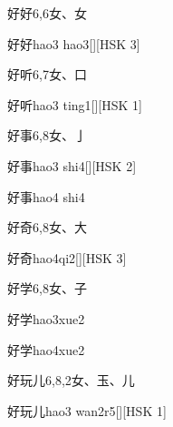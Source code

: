 \begin{entry}{好好}{6,6}{⼥、⼥}
  \begin{phonetics}{好好}{hao3 hao3}[][HSK 3]
  \end{phonetics}
\end{entry}

\begin{entry}{好听}{6,7}{⼥、⼝}
  \begin{phonetics}{好听}{hao3 ting1}[][HSK 1]
  \end{phonetics}
\end{entry}

\begin{entry}{好事}{6,8}{⼥、⼅}
  \begin{phonetics}{好事}{hao3 shi4}[][HSK 2]
  \end{phonetics}
  \begin{phonetics}{好事}{hao4 shi4}
  \end{phonetics}
\end{entry}

\begin{entry}{好奇}{6,8}{⼥、⼤}
  \begin{phonetics}{好奇}{hao4qi2}[][HSK 3]
  \end{phonetics}
\end{entry}

\begin{entry}{好学}{6,8}{⼥、⼦}
  \begin{phonetics}{好学}{hao3xue2}
  \end{phonetics}
  \begin{phonetics}{好学}{hao4xue2}
  \end{phonetics}
\end{entry}

\begin{entry}{好玩儿}{6,8,2}{⼥、⽟、⼉}
  \begin{phonetics}{好玩儿}{hao3 wan2r5}[][HSK 1]
  \end{phonetics}
\end{entry}

